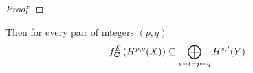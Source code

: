 \begin{proof}
    
\end{proof}

\begin{proposition}
    \label{Hodge lattice, fm transform interaction}
    Then for every pair of integers $(p,q)$
    \begin{equation}
        \label{eq: Hodge lattice, fm transform}
        f^{E}_\mathbf C\left(H^{p,q}(X)\right) \subseteq \bigoplus_{s - t = p - q} H^{s,t}(Y).
    \end{equation}
\end{proposition}